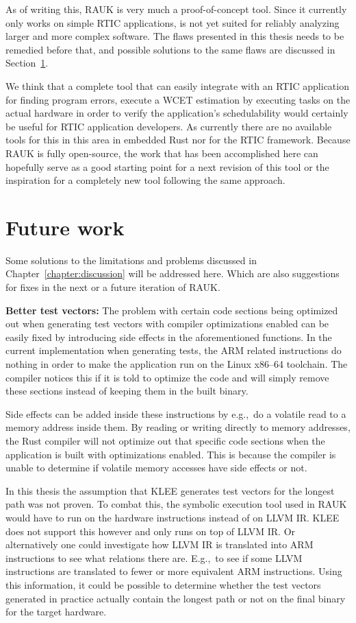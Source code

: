 As of writing this, RAUK is very much a proof-of-concept tool. Since it
currently only works on simple RTIC applications, is not yet suited for
reliably analyzing larger and more complex software. The flaws presented in
this thesis needs to be remedied before that, and possible solutions to the
same flaws are discussed in Section~\ref{chapter:futurework}.

We think that a complete tool that can easily integrate with an RTIC
application for finding program errors, execute a WCET estimation by executing
tasks on the actual hardware in order to verify the application's
schedulability would certainly be useful for RTIC application developers. As
currently there are no available tools for this in this area in embedded Rust
nor for the RTIC framework. Because RAUK is fully open-source, the work that
has been accomplished here can hopefully serve as a good starting point for a
next revision of this tool or the inspiration for a completely new tool
following the same approach.

\section{Future work}
\label{chapter:futurework}
Some solutions to the limitations and problems discussed in
Chapter~\ref{chapter:discussion} will be addressed here. Which are also
suggestions for fixes in the next or a future iteration of RAUK\@.

\textbf{Better test vectors:} The problem with certain code sections being
optimized out when generating test vectors with compiler optimizations enabled
can be easily fixed by introducing side effects in the aforementioned
functions. In the current implementation when generating tests, the ARM related
instructions do nothing in order to make the application run on the Linux
x86--64 toolchain. The compiler notices this if it is told to optimize the code
and will simply remove these sections instead of keeping them in the built
binary.

Side effects can be added inside these instructions by e.g.,\ do a volatile
read to a memory address inside them. By reading or writing directly to memory
addresses, the Rust compiler will not optimize out that specific code sections
when the application is built with optimizations enabled. This is because the
compiler is unable to determine if volatile memory accesses have side effects
or not.

In this thesis the assumption that KLEE generates test vectors for the longest
path was not proven. To combat this, the symbolic execution tool used in RAUK
would have to run on the hardware instructions instead of on LLVM IR\@. KLEE does
not support this however and only runs on top of LLVM IR\@. Or alternatively one
could investigate how LLVM IR is translated into ARM instructions to see what
relations there are. E.g.,\ to see if some LLVM instructions are translated to
fewer or more equivalent ARM instructions. Using this information, it could
be possible to determine whether the test vectors generated in practice
actually contain the longest path or not on the final binary for the target
hardware.


